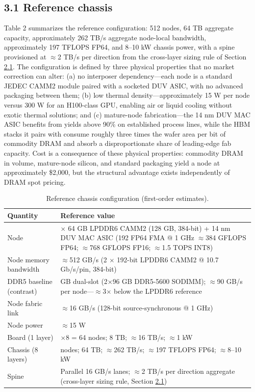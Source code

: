 \documentclass[10pt,twocolumn]{article}
\begin{document}
\subsection*{3.1 Reference chassis}\label{sec:3.1}

Table 2 summarizes the reference configuration: 512 nodes, 64 TB aggregate capacity, approximately 262 TB/s aggregate node-local bandwidth, approximately 197 TFLOPS FP64, and 8--10 kW chassis power, with a spine provisioned at $\approx$2 TB/s per direction from the cross-layer sizing rule of Section \hyperref[sec:2.1]{2.1}. The configuration is defined by three physical properties that no market correction can alter: (a) no interposer dependency---each node is a standard JEDEC CAMM2 module paired with a socketed DUV ASIC, with no advanced packaging between them; (b) low thermal density---approximately 15 W per node versus 300 W for an H100-class GPU, enabling air or liquid cooling without exotic thermal solutions; and (c) mature-node fabrication---the 14 nm DUV MAC ASIC benefits from yields above 90\% on established process lines, while the HBM stacks it pairs with consume roughly three times the wafer area per bit of commodity DRAM and absorb a disproportionate share of leading-edge fab capacity\cite{25}. Cost is a consequence of these physical properties: commodity DRAM in volume, mature-node silicon, and standard packaging yield a node at approximately \$2,000, but the structural advantage exists independently of DRAM spot pricing.

\begin{table}[t]
\centering
\footnotesize
\caption{Reference chassis configuration (first-order estimates).}\label{tab:2}
\begin{tabularx}{\columnwidth}{>{\hsize=0.5455\hsize}X>{\hsize=1.4545\hsize}X}
\toprule
Quantity & Reference value \\
\midrule
Node & 2 $\times$ 64 GB LPDDR6 CAMM2 (128 GB, 384-bit) + 14 nm DUV MAC ASIC (192 FP64 FMA @ 1 GHz $\approx$384 GFLOPS FP64; $\approx$768 GFLOPS FP16; $\approx$1.5 TOPS INT8) \\
Node memory bandwidth & $\approx$512 GB/s (2 $\times$ 192-bit LPDDR6 CAMM2 @ 10.7 Gb/s/pin, 384-bit) \\
DDR5 baseline (contrast) & 192 GB dual-slot (2$\times$96 GB DDR5-5600 SODIMM); $\approx$90 GB/s per node---$\approx$3$\times$ below the LPDDR6 reference \\
Node fabric link & $\approx$16 GB/s (128-bit source-synchronous @ 1 GHz) \\
Node power & $\approx$15 W \\
Board (1 layer) & 8$\times$8 = 64 nodes; 8 TB; $\approx$16 TB/s; $\approx$1 kW \\
Chassis (8 layers) & 512 nodes; 64 TB; $\approx$262 TB/s; $\approx$197 TFLOPS FP64; $\approx$8--10 kW \\
Spine & Parallel 16 GB/s lanes; $\approx$2 TB/s per direction aggregate (cross-layer sizing rule, Section \hyperref[sec:2.1]{2.1}) \\
\bottomrule
\end{tabularx}
\end{table}
\end{document}
